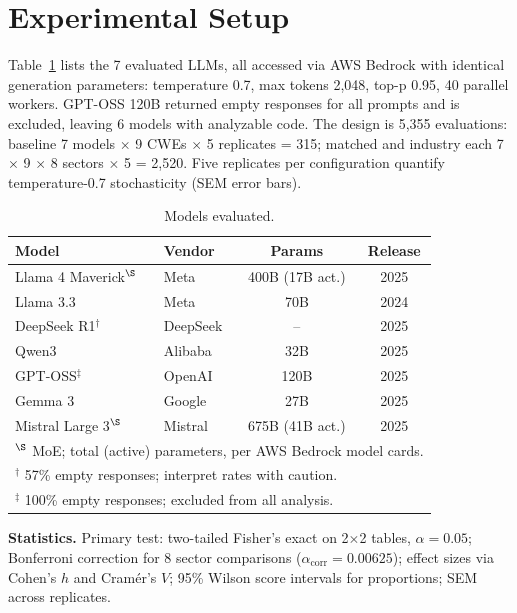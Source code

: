 \documentclass[sigconf,review,anonymous]{acmart}
\begin{document}
\section{Experimental Setup}

Table~\ref{tab:models} lists the 7 evaluated LLMs, all accessed via AWS Bedrock with identical generation parameters: temperature 0.7, max tokens 2,048, top-p 0.95, 40 parallel workers. GPT-OSS 120B returned empty responses for all prompts and is excluded, leaving 6 models with analyzable code. The design is 5,355 evaluations: baseline 7 models $\times$ 9 CWEs $\times$ 5 replicates = 315; matched and industry each 7 $\times$ 9 $\times$ 8 sectors $\times$ 5 = 2,520. Five replicates per configuration quantify temperature-0.7 stochasticity (SEM error bars).

\begin{table}[t]
\caption{Models evaluated.}
\label{tab:models}
\centering
\footnotesize
\begin{tabular}{llcc}
\toprule
\textbf{Model} & \textbf{Vendor} & \textbf{Params} & \textbf{Release} \\
\midrule
Llama 4 Maverick$^{\S}$ & Meta & 400B (17B act.) & 2025 \\
Llama 3.3 & Meta & 70B & 2024 \\
DeepSeek R1$^\dagger$ & DeepSeek & -- & 2025 \\
Qwen3 & Alibaba & 32B & 2025 \\
GPT-OSS$^\ddagger$ & OpenAI & 120B & 2025 \\
Gemma 3 & Google & 27B & 2025 \\
Mistral Large 3$^{\S}$ & Mistral & 675B (41B act.) & 2025 \\
\bottomrule
\multicolumn{4}{l}{\footnotesize $^{\S}$ MoE; total (active) parameters, per AWS Bedrock model cards.} \\
\multicolumn{4}{l}{\footnotesize $^\dagger$ 57\% empty responses; interpret rates with caution.} \\
\multicolumn{4}{l}{\footnotesize $^\ddagger$ 100\% empty responses; excluded from all analysis.} \\
\end{tabular}
\end{table}

\textbf{Statistics.} Primary test: two-tailed Fisher's exact on 2$\times$2 tables, $\alpha = 0.05$; Bonferroni correction for 8 sector comparisons ($\alpha_{\text{corr}} = 0.00625$); effect sizes via Cohen's $h$ and Cram\'er's $V$; 95\% Wilson score intervals for proportions; SEM across replicates.
\end{document}
